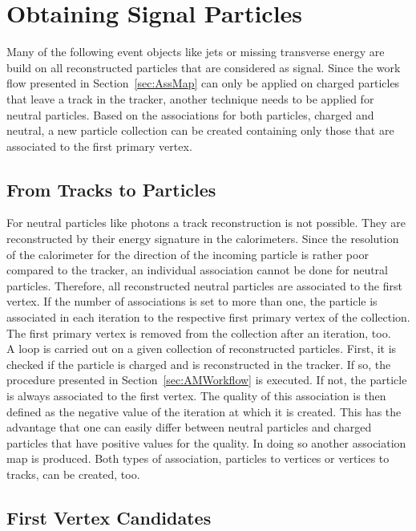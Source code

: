 \chapter{Obtaining Signal Particles \label{sec:OSP}}

Many of the following event objects like jets or missing transverse energy are build on all reconstructed particles that are considered as signal. Since the work flow presented in Section~\ref{sec:AssMap} can only be applied on charged particles that leave a track in the tracker, another technique needs to be applied for neutral particles. Based on the associations for both particles, charged and neutral, a new particle collection can be created containing only those that are associated to the first primary vertex.

\section{From Tracks to Particles \label{sec:OSPT2P}}

For neutral particles like photons a track reconstruction is not possible. They are reconstructed by their energy signature in the calorimeters. Since the resolution of the calorimeter for the direction of the incoming particle is rather poor compared to the tracker, an individual association cannot be done for neutral particles. Therefore, all reconstructed neutral particles are associated to the first vertex. If the number of associations is set to more than one, the particle is associated in each iteration to the respective first primary vertex of the collection. The first primary vertex is removed from the collection after an iteration, too. \\
A loop is carried out on a given collection of reconstructed particles. First, it is checked if the particle is charged and is reconstructed in the tracker. If so, the procedure presented in Section~\ref{sec:AMWorkflow} is executed. If not, the particle is always associated to the first vertex. The quality of this association is then defined as the negative value of the iteration at which it is created.  This has the advantage that one can easily differ between neutral particles and charged particles that have positive values for the quality. In doing so another association map is produced. Both types of association, particles to vertices or vertices to tracks, can be created, too.

\section{First Vertex Candidates \label{sec:OSPFVC}}

